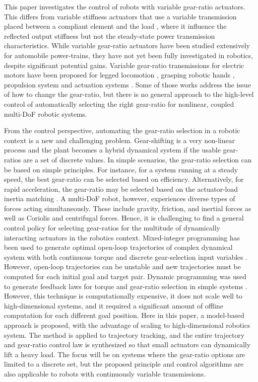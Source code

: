 This paper investigates the control of robots with variable gear-ratio actuators. This differs from variable stiffness actuators that use a variable transmission placed between a compliant element and the load \cite{vanderborght_variable_2013}, where it influence the reflected output stiffness but not the steady-state power transmission characteristics. While variable gear-ratio actuators have been studied extensively for automobile power-trains, they have not yet been fully investigated in robotics, despite significant potential gains. Variable gear-ratio transmissions for electric motors have been proposed for legged locomotion \cite{hirose_design_1991}, grasping robotic hands \cite{shin_robot_2012} , propulsion system \cite{lee_new_2012} \cite{mckeegan_antonovs_2011} and actuation systems \cite{girard_two-speed_2015} \cite{hirose_development_1999} \cite{tahara_high-backdrivable_2011}. Some of those works address the issue of how to change the gear-ratio, but there is no general approach to the high-level control of automatically selecting the right gear-ratio for nonlinear, coupled multi-DoF robotic systems.


From the control perspective, automating the gear-ratio selection in a robotic context is a new and challenging problem. Gear-shifting is a very non-linear process and the plant becomes a hybrid dynamical system if the usable gear-ratios are a set of discrete values. In simple scenarios, the gear-ratio selection can be based on simple principles. For instance, for a system running at a steady speed, the best gear-ratio can be selected based on efficiency. Alternatively, for rapid acceleration, the gear-ratio may be selected based on the actuator-load inertia matching \cite{giberti_effects_2010} \cite{chen_generalized_1991}. A multi-DoF robot, however, experiences diverse types of forces acting simultaneously. These include gravity, friction, and inertial forces as well as Coriolis and centrifugal forces. Hence, it is challenging to find a general control policy for selecting gear-ratios for the multitude of dynamically interacting actuators in the robotics context. Mixed-integer programming has been used to generate optimal open-loop trajectories of complex dynamical system with both continuous torque and discrete gear-selection input variables \cite{gerdts_solving_2005}. However, open-loop trajectories can be unstable and new trajectories must be computed for each initial goal and target pair. Dynamic programming was used to generate feedback laws for torque and gear-ratio selection in simple systems \cite{girard_practical_2016}. However, this technique is computationally expensive, it does not scale well to high-dimensional systems, and it required a significant amount of offline computation for each different goal position. Here in this paper, a model-based approach is proposed, with the advantage of scaling to high-dimensional robotics system. The method is applied to trajectory tracking, and the entire trajectory and gear-ratio control law is synthesized so that small actuators can dynamically lift a heavy load. The focus will be on systems where the gear-ratio options are limited to a discrete set, but the proposed principle and control algorithms are also applicable to robots with continuously variable transmissions.


